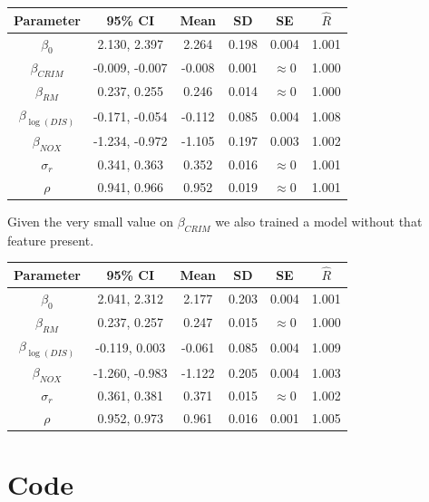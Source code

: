 \documentclass[11pt]{article}
\begin{document}
\begin{center}
\begin{tabular}{ c  | c | c | c | c | c}
\hline
 Parameter & 95\% CI & Mean & SD & SE & $\hat{R}$ \\ 
 \hline
 $\beta_0$ & 2.130, 2.397 & 2.264 & 0.198 & 0.004 & 1.001 \\
 $\beta_{CRIM}$ & -0.009, -0.007 & -0.008 & 0.001 & $\approx 0$ & 1.000 \\
 $\beta_{RM}$ & 0.237, 0.255 & 0.246 & 0.014 & $\approx 0$  & 1.000\\
 $\beta_{\log{(DIS)}}$ & -0.171, -0.054 & -0.112 & 0.085 & 0.004 & 1.008 \\
 $\beta_{NOX}$ & -1.234, -0.972 & -1.105 & 0.197 & 0.003 & 1.002 \\
 $\sigma_r$ & 0.341, 0.363 & 0.352 & 0.016 & $\approx 0$ & 1.001 \\
$\rho$ & 0.941, 0.966 & 0.952 & 0.019 & $\approx 0$ & 1.001 \\
\end{tabular}
\end{center}

Given the very small value on $\beta_{CRIM}$ we also trained a model without that feature present. 

\begin{center}
\begin{tabular}{ c  | c | c | c | c | c}
\hline
 Parameter & 95\% CI & Mean & SD & SE & $\hat{R}$ \\ 
 \hline
 $\beta_0$ & 2.041,  2.312 & 2.177 & 0.203 & 0.004 & 1.001 \\
 $\beta_{RM}$ & 0.237, 0.257 & 0.247 & 0.015 & $\approx 0$ & 1.000 \\
 $\beta_{\log{(DIS)}}$ & -0.119, 0.003 & -0.061 & 0.085 & 0.004 & 1.009 \\
 $\beta_{NOX}$ & -1.260, -0.983 & -1.122 & 0.205 & 0.004 & 1.003 \\
 $\sigma_r$ & 0.361, 0.381 & 0.371 & 0.015 & $\approx 0$ & 1.002 \\
 $\rho$ & 0.952, 0.973 & 0.961 & 0.016 & 0.001 & 1.005 \\
\end{tabular}
\end{center}

\newpage



\section{Code}
\end{document}
